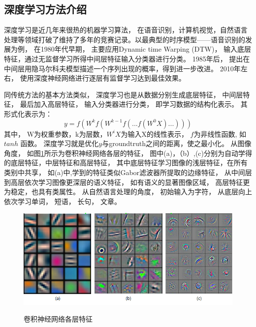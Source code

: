 \subsection{深度学习方法介绍}

深度学习是近几年来很热的机器学习算法， 在语音识别，计算机视觉，自然语言处理等领域打破了维持了多年的竞赛记录。以最典型的时序模型——语音识别的发展为例， 在1980年代早期， 主要应用Dynamic time Warping (DTW)\cite{juang1984hidden,myers1981comparative,rabiner1978considerations,berndt1994using}， 输入底层特征，通过无监督学习所得中间层特征输入分类器进行分类。 1985年后， \cite{huang1990hidden,rabiner1989tutorial,rabiner1986introduction}提出在中间层用隐马尔科夫模型描述一个序列出现的概率，得到进一步改进。 2010年左右， 使用深度神经网络进行逐层有监督学习达到最佳效果\cite{waibel1989modular,nakamura1989speaker}。


同传统方法的基本方法类似， 深度学习也是从数据分别生成底层特征， 中间层特征， 最后加入高层特征， 输入分类器进行分类， 即学习数据的结构化表示。 其形式化表示为：
\begin{equation}
y=f(W^kf(W^{k-1}f(...f(W^0X)...)))
\label{Eq:dl_formulation}
\end{equation}
其中， W为权重参数，k为层数，$W^iX$为输入X的线性表示， $f$为非线性函数, 如$tanh$ 函数。 深度学习就是优化$y$与groundtruth之间的距离，使之最小化。 从图像角度， 如图\ref{fig:feature_level}所示为卷积神经网络各层的特征， 图中(a)，（b）,(c)分别为自动学得的底层特征，中层特征和高层特征， 其中底层特征学习图像的浅层特征，在所有类别中共享， 如(a)中,学到的特征类似Gabor滤波器所提取的边缘特征\cite{ngiam2010tiled,shi1998gabor}， 从中间层到高层依次学习图像更深层的语义特征， 如有语义的显著图像区域， 高层特征更为稳定，也具有类属性。  从自然语言处理的角度， 初始输入为字符， 从底层向上依次学习单词， 短语， 长句， 文章。

\begin{figure}[htb]
  \centering
  \includegraphics[scale=0.9]{Pictures/CNN/low_mid_high_feature.png}\\
  \caption{卷积神经网络各层特征\cite{zeiler2014visualizing}}\label{fig:feature_level}
\end{figure}


